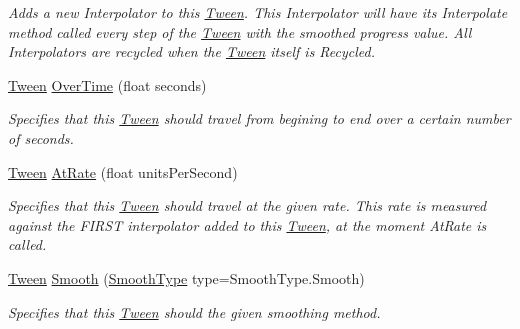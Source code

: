 \begin{DoxyCompactItemize}
\begin{DoxyCompactList}\small\item\em Adds a new Interpolator to this \mbox{\hyperlink{struct_leap_1_1_unity_1_1_animation_1_1_tween}{Tween}}. This Interpolator will have it\textquotesingle{}s Interpolate method called every step of the \mbox{\hyperlink{struct_leap_1_1_unity_1_1_animation_1_1_tween}{Tween}} with the smoothed progress value. All Interpolators are recycled when the \mbox{\hyperlink{struct_leap_1_1_unity_1_1_animation_1_1_tween}{Tween}} itself is Recycled. \end{DoxyCompactList}\item 
\mbox{\hyperlink{struct_leap_1_1_unity_1_1_animation_1_1_tween}{Tween}} \mbox{\hyperlink{struct_leap_1_1_unity_1_1_animation_1_1_tween_a233ad9426dc52f71fd5ac36500946d76}{Over\+Time}} (float seconds)
\begin{DoxyCompactList}\small\item\em Specifies that this \mbox{\hyperlink{struct_leap_1_1_unity_1_1_animation_1_1_tween}{Tween}} should travel from begining to end over a certain number of seconds. \end{DoxyCompactList}\item 
\mbox{\hyperlink{struct_leap_1_1_unity_1_1_animation_1_1_tween}{Tween}} \mbox{\hyperlink{struct_leap_1_1_unity_1_1_animation_1_1_tween_a8a9610fdde3d806fdd7ca4c6e06f1645}{At\+Rate}} (float units\+Per\+Second)
\begin{DoxyCompactList}\small\item\em Specifies that this \mbox{\hyperlink{struct_leap_1_1_unity_1_1_animation_1_1_tween}{Tween}} should travel at the given rate. This rate is measured against the F\+I\+R\+ST interpolator added to this \mbox{\hyperlink{struct_leap_1_1_unity_1_1_animation_1_1_tween}{Tween}}, at the moment At\+Rate is called. \end{DoxyCompactList}\item 
\mbox{\hyperlink{struct_leap_1_1_unity_1_1_animation_1_1_tween}{Tween}} \mbox{\hyperlink{struct_leap_1_1_unity_1_1_animation_1_1_tween_a7bb854a75ebd46b16addf1018768d6cd}{Smooth}} (\mbox{\hyperlink{namespace_leap_1_1_unity_1_1_animation_a9667bc3fe4218574cb25efb892505c77}{Smooth\+Type}} type=Smooth\+Type.\+Smooth)
\begin{DoxyCompactList}\small\item\em Specifies that this \mbox{\hyperlink{struct_leap_1_1_unity_1_1_animation_1_1_tween}{Tween}} should the given smoothing method. \end{DoxyCompactList}\item 

\end{DoxyCompactItemize}

